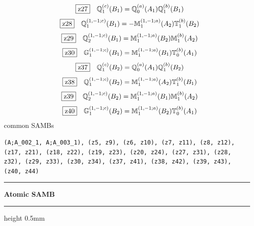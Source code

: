 \documentclass[fleqn,10pt,landscape]{jsarticle}
\begin{document}
\begin{dmath*}
\hspace*{3mm}\fbox{z27}\quad \mathbb{Q}_{1}^{(c)}(B_{1})=\mathbb{Q}_{0}^{(a)}(A_{1}) \mathbb{Q}_{1}^{(b)}(B_{1})
\end{dmath*}
\begin{dmath*}
\hspace*{3mm}\fbox{z28}\quad \mathbb{Q}_{1}^{(1,-1;c)}(B_{1})=- \mathbb{M}_{1}^{(1,-1;a)}(A_{2}) \mathbb{T}_{1}^{(b)}(B_{2})
\end{dmath*}
\begin{dmath*}
\hspace*{3mm}\fbox{z29}\quad \mathbb{Q}_{2}^{(1,-1;c)}(B_{1})=\mathbb{M}_{1}^{(1,-1;a)}(B_{2}) \mathbb{M}_{1}^{(b)}(A_{2})
\end{dmath*}
\begin{dmath*}
\hspace*{3mm}\fbox{z30}\quad \mathbb{G}_{1}^{(1,-1;c)}(B_{1})=\mathbb{M}_{1}^{(1,-1;a)}(B_{1}) \mathbb{T}_{0}^{(b)}(A_{1})
\end{dmath*}
\begin{dmath*}
\hspace*{3mm}\fbox{z37}\quad \mathbb{Q}_{1}^{(c)}(B_{2})=\mathbb{Q}_{0}^{(a)}(A_{1}) \mathbb{Q}_{1}^{(b)}(B_{2})
\end{dmath*}
\begin{dmath*}
\hspace*{3mm}\fbox{z38}\quad \mathbb{Q}_{1}^{(1,-1;c)}(B_{2})=\mathbb{M}_{1}^{(1,-1;a)}(A_{2}) \mathbb{T}_{1}^{(b)}(B_{1})
\end{dmath*}
\begin{dmath*}
\hspace*{3mm}\fbox{z39}\quad \mathbb{Q}_{2}^{(1,-1;c)}(B_{2})=\mathbb{M}_{1}^{(1,-1;a)}(B_{1}) \mathbb{M}_{1}^{(b)}(A_{2})
\end{dmath*}
\begin{dmath*}
\hspace*{3mm}\fbox{z40}\quad \mathbb{G}_{1}^{(1,-1;c)}(B_{2})=\mathbb{M}_{1}^{(1,-1;a)}(B_{2}) \mathbb{T}_{0}^{(b)}(A_{1})
\end{dmath*}
\noindent * common SAMBs

\noindent\texttt{(A;A_002_1, A;A_003_1), (z5, z9), (z6, z10), (z7, z11), (z8, z12), (z17, z21), (z18, z22), (z19, z23), (z20, z24), (z27, z31), (z28, z32), (z29, z33), (z30, z34), (z37, z41), (z38, z42), (z39, z43), (z40, z44)}
\vspace{5mm}

\vspace{5mm}
\noindent \rule[0.5mm]{5mm}{0.5mm}\hspace{3mm}\textbf{Atomic SAMB}\hspace{3mm}\leaders\hrule height 0.5mm\hfill\kern0pt
\vspace{3mm}
\end{document}
